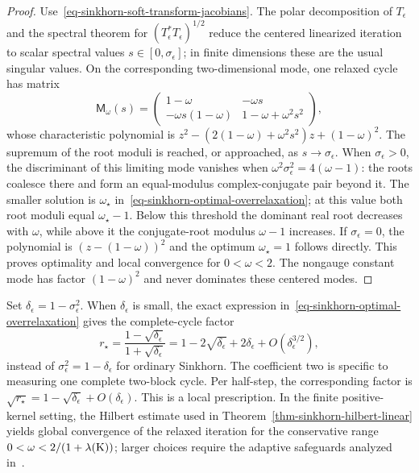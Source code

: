 \begin{proof}
	Use~\eqref{eq-sinkhorn-soft-transform-jacobians}. The polar decomposition of $T_\epsilon$ and the spectral theorem for $(T_\epsilon^*T_\epsilon)^{1/2}$ reduce the centered linearized iteration to scalar spectral values $s\in[0,\sigma_\epsilon]$; in finite dimensions these are the usual singular values. On the corresponding two-dimensional mode, one relaxed cycle has matrix
	\[
		\mathsf M_\omega(s)
		=
		\begin{pmatrix}
			1-\omega&-\omega s\\
			-\omega s(1-\omega)&1-\omega+\omega^2s^2
		\end{pmatrix},
	\]
	whose characteristic polynomial is $z^2-(2(1-\omega)+\omega^2s^2)z+(1-\omega)^2$.
	The supremum of the root moduli is reached, or approached, as $s\to\sigma_\epsilon$. When $\sigma_\epsilon>0$, the discriminant of this limiting mode vanishes when
	\(\omega^2\sigma_\epsilon^2=4(\omega-1)\):
	the roots coalesce there and form an equal-modulus complex-conjugate pair beyond it. The smaller solution is $\omega_\star$ in~\eqref{eq-sinkhorn-optimal-overrelaxation}; at this value both root moduli equal $\omega_\star-1$. Below this threshold the dominant real root decreases with $\omega$, while above it the conjugate-root modulus $\omega-1$ increases. If $\sigma_\epsilon=0$, the polynomial is $(z-(1-\omega))^2$ and the optimum $\omega_\star=1$ follows directly. This proves optimality and local convergence for $0<\omega<2$.
	The nongauge constant mode has factor $(1-\omega)^2$ and never dominates these centered modes.
\end{proof}

Set $\delta_\epsilon=1-\sigma_\epsilon^2$. When $\delta_\epsilon$ is small, the exact expression in~\eqref{eq-sinkhorn-optimal-overrelaxation} gives the complete-cycle factor
\[
	r_\star
	=
	\frac{1-\sqrt{\delta_\epsilon}}{1+\sqrt{\delta_\epsilon}}
	=
	1-2\sqrt{\delta_\epsilon}
	+2\delta_\epsilon
	+O(\delta_\epsilon^{3/2}),
\]
instead of $\sigma_\epsilon^2=1-\delta_\epsilon$ for ordinary Sinkhorn. The coefficient two is specific to measuring one complete two-block cycle. Per half-step, the corresponding factor is
\(
	\sqrt{r_\star}=1-\sqrt{\delta_\epsilon}+O(\delta_\epsilon)
\).
This is a local prescription. In the finite positive-kernel setting, the Hilbert estimate used in Theorem~\ref{thm-sinkhorn-hilbert-linear} yields global convergence of the relaxed iteration for the conservative range~\cite{lehmann2022overrelaxation}
\(
	0<\omega<2/(1+\lambda(\mathrm{K}))
\);
larger choices require the adaptive safeguards analyzed in~\cite{thibault2021overrelaxed,lehmann2022overrelaxation}.

